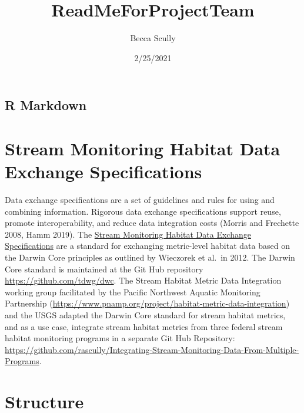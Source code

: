 \documentclass[
]{article}
\title{ReadMeForProjectTeam}
\author{Becca Scully}
\date{2/25/2021}
\begin{document}
\maketitle

\hypertarget{r-markdown}{%
\subsection{R Markdown}\label{r-markdown}}

\hypertarget{stream-monitoring-habitat-data-exchange-specifications}{%
\section{Stream Monitoring Habitat Data Exchange
Specifications}\label{stream-monitoring-habitat-data-exchange-specifications}}

Data exchange specifications are a set of guidelines and rules for using
and combining information. Rigorous data exchange specifications support
reuse, promote interoperability, and reduce data integration costs
(Morris and Frechette 2008, Hamm 2019). The
\href{MetricLevelExchangeSpecifications.docx}{Stream Monitoring Habitat
Data Exchange Specifications} are a standard for exchanging metric-level
habitat data based on the Darwin Core principles as outlined by
Wieczorek et al.~in 2012. The Darwin Core standard is maintained at the
Git Hub repository \url{https://github.com/tdwg/dwc}. The Stream Habitat
Metric Data Integration working group facilitated by the Pacific
Northwest Aquatic Monitoring Partnership
(\url{https://www.pnamp.org/project/habitat-metric-data-integration})
and the USGS adapted the Darwin Core standard for stream habitat
metrics, and as a use case, integrate stream habitat metrics from three
federal stream habitat monitoring programs in a separate Git Hub
Repository:
\url{https://github.com/rascully/Integrating-Stream-Monitoring-Data-From-Multiple-Programs}.

\hypertarget{structure}{%
\section{Structure}\label{structure}}
\end{document}
